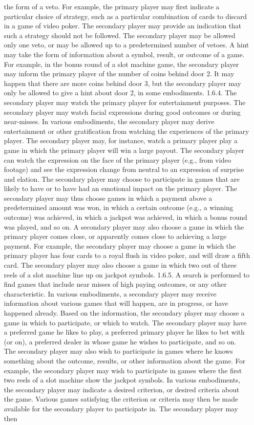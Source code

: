\documentclass[11pt,a4paper]{article}
\begin{document}
the form of a veto. For example, the primary player may first indicate a particular choice of strategy, such as a particular combination of cards to discard in a game of video poker. The secondary player may provide an indication that such a strategy should not be followed. The secondary player may be allowed only one veto, or may be allowed up to a predetermined number of vetoes. A hint may take the form of information about a symbol, result, or outcome of a game. For example, in the bonus round of a slot machine game, the secondary player may inform the primary player of the number of coins behind door 2. It may happen that there are more coins behind door 3, but the secondary player may only be allowed to give a hint about door 2, in some embodiments. 1.6.4. The secondary player may watch the primary player for entertainment purposes. The secondary player may watch facial expressions during good outcomes or during near-misses. In various embodiments, the secondary player may derive entertainment or other gratification from watching the experiences of the primary player. The secondary player may, for instance, watch a primary player play a game in which the primary player will win a large payout. The secondary player can watch the expression on the face of the primary player (e.g., from video footage) and see the expression change from neutral to an expression of surprise and elation. The secondary player may choose to participate in games that are likely to have or to have had an emotional impact on the primary player. The secondary player may thus choose games in which a payment above a predetermined amount was won, in which a certain outcome (e.g., a winning outcome) was achieved, in which a jackpot was achieved, in which a bonus round was played, and so on. A secondary player may also choose a game in which the primary player comes close, or apparently comes close to achieving a large payment. For example, the secondary player may choose a game in which the primary player has four cards to a royal flush in video poker, and will draw a fifth card. The secondary player may also choose a game in which two out of three reels of a slot machine line up on jackpot symbols. 1.6.5. A search is performed to find games that include near misses of high paying outcomes, or any other characteristic. In various embodiments, a secondary player may receive information about various games that will happen, are in progress, or have happened already. Based on the information, the secondary player may choose a game in which to participate, or which to watch. The secondary player may have a preferred game he likes to play, a preferred primary player he likes to bet with (or on), a preferred dealer in whose game he wishes to participate, and so on. The secondary player may also wish to participate in games where he knows something about the outcome, results, or other information about the game. For example, the secondary player may wish to participate in games where the first two reels of a slot machine show the jackpot symbols. In various embodiments, the secondary player may indicate a desired criterion, or desired criteria about the game. Various games satisfying the criterion or criteria may then be made available for the secondary player to participate in. The secondary player may then 
\end{document}
